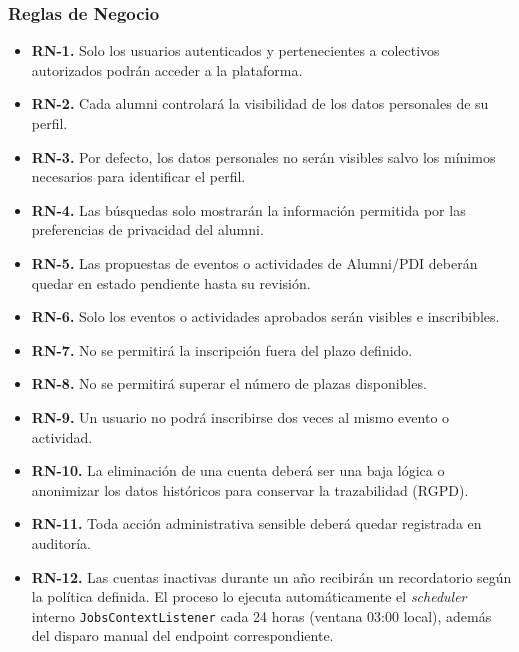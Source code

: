 \documentclass{report}
\begin{document}
\subsubsection{Reglas de Negocio}
\begin{itemize}
    \item \textbf{RN-1.} Solo los usuarios autenticados y pertenecientes a colectivos autorizados podrán acceder a la plataforma.
    \item \textbf{RN-2.} Cada alumni controlará la visibilidad de los datos personales de su perfil.
    \item \textbf{RN-3.} Por defecto, los datos personales no serán visibles salvo los mínimos necesarios para identificar el perfil.
    \item \textbf{RN-4.} Las búsquedas solo mostrarán la información permitida por las preferencias de privacidad del alumni.
    \item \textbf{RN-5.} Las propuestas de eventos o actividades de Alumni/PDI deberán quedar en estado pendiente hasta su revisión.
    \item \textbf{RN-6.} Solo los eventos o actividades aprobados serán visibles e inscribibles.
    \item \textbf{RN-7.} No se permitirá la inscripción fuera del plazo definido.
    \item \textbf{RN-8.} No se permitirá superar el número de plazas disponibles.
    \item \textbf{RN-9.} Un usuario no podrá inscribirse dos veces al mismo evento o actividad.
    \item \textbf{RN-10.} La eliminación de una cuenta deberá ser una baja lógica o anonimizar los datos históricos para conservar la trazabilidad (RGPD).
    \item \textbf{RN-11.} Toda acción administrativa sensible deberá quedar registrada en auditoría.
    \item \textbf{RN-12.} Las cuentas inactivas durante un año recibirán un recordatorio según la política definida. El proceso lo ejecuta automáticamente el \textit{scheduler} interno \texttt{JobsContextListener} cada 24 horas (ventana 03:00 local), además del disparo manual del endpoint correspondiente.
\end{itemize}
\end{document}
